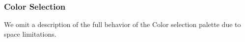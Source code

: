 \documentclass[10pt, conference, compsocconf]{IEEEtran}
\begin{document}
\subsubsection{Color Selection}
We omit a description of the full behavior of the Color selection palette due to space limitations. 
%
%
%
%
%
%
\end{document}
